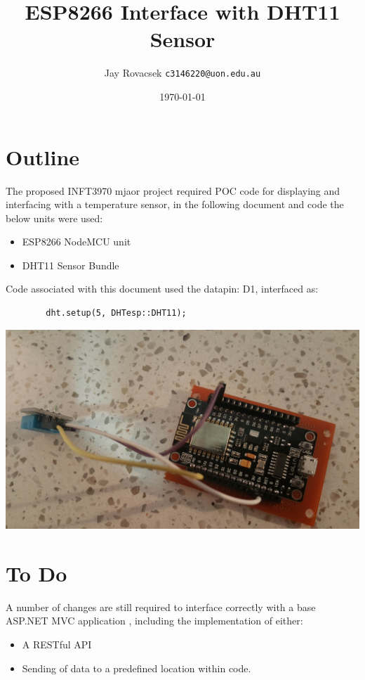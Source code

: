 \documentclass{article}
\title{ESP8266 Interface with DHT11 Sensor}
\author{
        Jay Rovacsek
        \texttt{c3146220@uon.edu.au}\\
    }
\date{\today}
\begin{document}
    \begin{titlingpage}
        \maketitle
    \end{titlingpage}
    \newpage
    
    \section{Outline}
    The proposed INFT3970 mjaor project required POC code for displaying and interfacing
    with a temperature sensor, in the following document and code the below units were used:
    \begin{itemize}
        \item ESP8266 NodeMCU unit \cite{ESP8266-EBAY}
        \item DHT11 Sensor Bundle \cite{DHT11-JAYCAR}
    \end{itemize}
    Code associated with this document used the datapin: D1, interfaced as:
    \begin{lstlisting}
        dht.setup(5, DHTesp::DHT11);
    \end{lstlisting}

    \includegraphics[width=\textwidth]{hardware-setup.jpg}

    \section{To Do}
    A number of changes are still required to interface correctly with a base
    ASP.NET MVC application \cite{Main-Project}, including the implementation of either:
    \begin{itemize}
        \item A RESTful API
        \item Sending of data to a predefined location within code.
    \end{itemize}
\end{document}
